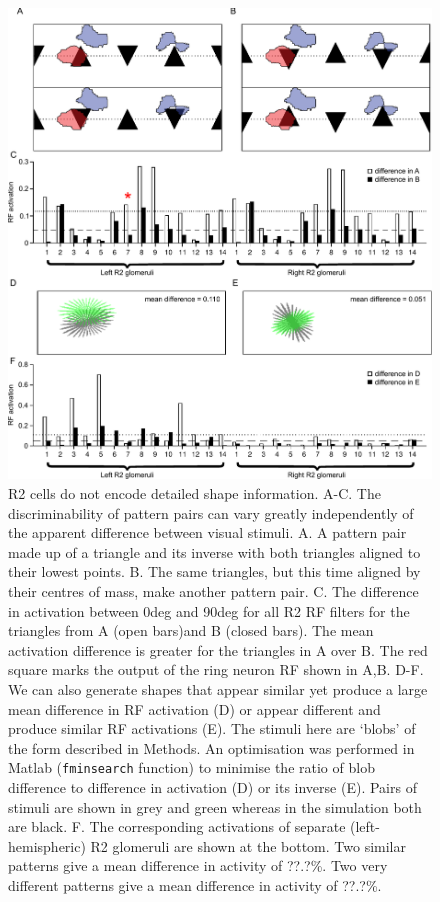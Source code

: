 \begin{figure}
\centering
\includegraphics{figures/simdiffpatts}
\caption{R2 cells do not encode detailed shape information.
A-C. The discriminability of pattern pairs can vary greatly independently of the apparent difference between visual stimuli. A. A pattern pair made up of a triangle and its inverse with both triangles aligned to their lowest points. B. The same triangles, but this time aligned by their centres of mass, make another pattern pair. C. The difference in activation between 0deg and 90deg for all R2 RF filters for the triangles from A (open bars)and B (closed bars). The mean activation difference is greater for the triangles in A over B. The red square marks the output of the ring neuron RF shown in A,B. 
D-F. We can also generate shapes that appear similar yet produce a large mean difference in RF activation (D) or appear different and produce similar RF activations (E). The stimuli here are `blobs' of the form described in Methods. An optimisation was performed in Matlab (\texttt{fminsearch} function) to minimise the ratio of blob difference to difference in activation (D) or its inverse (E). Pairs of stimuli are shown in grey and green whereas in the simulation both are black.
F. The corresponding activations of separate (left-hemispheric) R2 glomeruli are shown at the bottom. Two similar patterns give a mean difference in activity of ??.?\%. Two very different patterns give a mean difference in activity of ??.?\%.
}

\label{fig:simdiffpatts}
\end{figure}